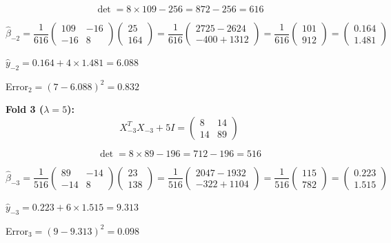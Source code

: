 \documentclass[12pt]{article}
\begin{document}
\begin{solution}
\[\det = 8 \times 109 - 256 = 872 - 256 = 616\]

\[\hat{\beta}_{-2} = \frac{1}{616}\begin{pmatrix} 109 & -16 \\ -16 & 8 \end{pmatrix}\begin{pmatrix} 25 \\ 164 \end{pmatrix} = \frac{1}{616}\begin{pmatrix} 2725 - 2624 \\ -400 + 1312 \end{pmatrix} = \frac{1}{616}\begin{pmatrix} 101 \\ 912 \end{pmatrix} = \begin{pmatrix} 0.164 \\ 1.481 \end{pmatrix}\]

$\hat{y}_{-2} = 0.164 + 4 \times 1.481 = 6.088$

Error$_2 = (7 - 6.088)^2 = 0.832$

\textbf{Fold 3 ($\lambda = 5$):}
\[X_{-3}^TX_{-3} + 5I = \begin{pmatrix} 8 & 14 \\ 14 & 89 \end{pmatrix}\]

\[\det = 8 \times 89 - 196 = 712 - 196 = 516\]

\[\hat{\beta}_{-3} = \frac{1}{516}\begin{pmatrix} 89 & -14 \\ -14 & 8 \end{pmatrix}\begin{pmatrix} 23 \\ 138 \end{pmatrix} = \frac{1}{516}\begin{pmatrix} 2047 - 1932 \\ -322 + 1104 \end{pmatrix} = \frac{1}{516}\begin{pmatrix} 115 \\ 782 \end{pmatrix} = \begin{pmatrix} 0.223 \\ 1.515 \end{pmatrix}\]

$\hat{y}_{-3} = 0.223 + 6 \times 1.515 = 9.313$

Error$_3 = (9 - 9.313)^2 = 0.098$


\end{solution}
\end{document}
